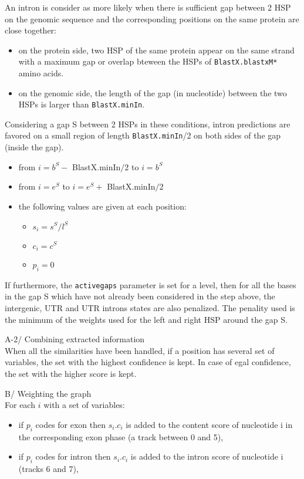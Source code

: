 An intron is consider as more likely when there is sufficient gap between 2 HSP 
on the genomic sequence and the corresponding positions on the same 
protein are close together:
\begin{itemize}
\item on the protein side,  two HSP of the same protein appear on the same strand
  with a  maximum gap or overlap bteween the HSPs of \texttt{BlastX.blastxM*} amino acids.
\item on the genomic side, the length of the gap (in nucleotide) between 
the two HSPs is larger than \texttt{BlastX.minIn}.
\end{itemize}
Considering a gap S between 2 HSPs in these conditions, 
intron predictions are favored on a small region of
length \texttt{BlastX.minIn}/2 on both sides of the gap (inside the gap). 
\begin{itemize}
\item from $i = b^S -$ BlastX.minIn$/2$ to $i = b^S$ 
\item from $i = e^S$ to $i = e^S +$ BlastX.minIn$/2$ 
\item the following values are given at each position:
  \begin{itemize}
  \item $s_i = s^S / l^S$ 
  \item $c_i = c^S$ 
  \item $p_i = 0$
  \end{itemize}
\end{itemize}

If furthermore, the \texttt{activegaps} parameter is set for a level, then for all the bases
in the gap S which have not already been considered in the step above, the
intergenic, UTR and UTR introns states are also penalized. The penality used is the minimum
of the weights used for the left and right HSP around the gap S.

A-2/ Combining extracted information\\

When all the similarities have been handled, if a position has several
set of variables, the set with the highest confidence is kept. In
case of egal confidence, the set with the higher score is kept.

B/ Weighting the graph\\

For each $i$ with a set of variables:
\begin{itemize}
\item if $p_i$ codes for exon then $s_i .c_i$ is added to the content
  score of nucleotide i in the corresponding exon phase (a track
  between 0 and 5),
\item if $p_i$ codes for intron then $s_i .c_i$ is added to the intron
  score of nucleotide i (tracks 6 and 7),
\end{itemize}

